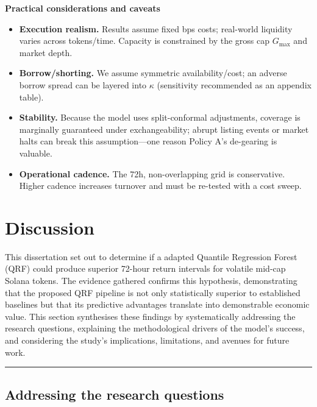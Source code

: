 \documentclass[
  a4paper,
  DIV=11,
  numbers=noendperiod]{scrreprt}
\providecommand{\tightlist}{%
  \setlength{\itemsep}{0pt}\setlength{\parskip}{0pt}}
\begin{document}
\textbf{Practical considerations and caveats}

\begin{itemize}
\tightlist
\item
  \textbf{Execution realism.} Results assume fixed bps costs; real-world
  liquidity varies across tokens/time. Capacity is constrained by the
  gross cap \(G_{\max}\) and market depth.
\item
  \textbf{Borrow/shorting.} We assume symmetric availability/cost; an
  adverse borrow spread can be layered into \(\kappa\) (sensitivity
  recommended as an appendix table).
\item
  \textbf{Stability.} Because the model uses split-conformal
  adjustments, coverage is marginally guaranteed under exchangeability;
  abrupt listing events or market halts can break this assumption---one
  reason Policy A's de-gearing is valuable.
\item
  \textbf{Operational cadence.} The 72h, non-overlapping grid is
  conservative. Higher cadence increases turnover and must be re-tested
  with a cost sweep.
\end{itemize}


\chapter{Discussion}\label{discussion}

This dissertation set out to determine if a adapted Quantile Regression
Forest (QRF) could produce superior 72-hour return intervals for
volatile mid-cap Solana tokens. The evidence gathered confirms this
hypothesis, demonstrating that the proposed QRF pipeline is not only
statistically superior to established baselines but that its predictive
advantages translate into demonstrable economic value. This section
synthesises these findings by systematically addressing the research
questions, explaining the methodological drivers of the model's success,
and considering the study's implications, limitations, and avenues for
future work.

\begin{center}\rule{0.5\linewidth}{0.5pt}\end{center}

\section{Addressing the research
questions}\label{addressing-the-research-questions}
\end{document}
